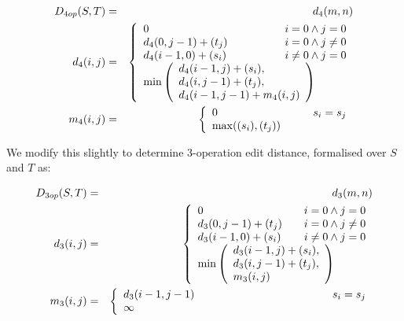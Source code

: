   \begin{eqnarray}
    D_{4op}(S,T) & = & d_4(m,n)\\
    d_4(i,j) & = & \left\{
      \begin{array}{l}
        0 \hfill\mathit{if}\; i=0\wedge j=0\\
        d_4(0,j-1) + \sweight(t_j) \hfill \mathit{if}\; i=0\wedge j\ne 0\\
        d_4(i-1,0) + \sweight(s_i) \hfill\mathit{if}\; i\ne0\wedge j=0\\
        \min\left(
          \begin{array}{l}
            d_4(i-1,j)+\sweight(s_i),\\
            d_4(i,j-1)+\sweight(t_j),\\
            d_4(i-1,j-1)+m_4(i,j)\\
          \end{array}
        \right)\hspace*{10mm}\hfill\mathit{otherwise}
      \end{array}
    \right.\\
    m_4(i,j) & = & \left\{
      \begin{array}{l}
        0 \hfill\mathit{if}\;s_i=s_j\\
        \max(\sweight(s_i),\sweight(t_j))\hspace*{21mm}\hfill\mathit{otherwise}
      \end{array}
    \right.
  \end{eqnarray}

We modify this slightly to determine 3-operation edit distance,
formalised over $S$ and $T$ as:

\begin{eqnarray}
  D_{3op}(S,T) & = & d_3(m,n)\\
  d_3(i,j) & = & \left\{
    \begin{array}{l}
      0 \hfill\mathit{if}\; i=0\wedge j=0\\
      d_3(0,j-1) + \sweight(t_j) \hfill \mathit{if}\; i=0\wedge j\ne 0\\
      d_3(i-1,0) + \sweight(s_i) \hfill\mathit{if}\; i\ne 0\wedge j=0\\
      \min\left(
        \begin{array}{l}
          d_3(i-1,j)+\sweight(s_i),\\
          d_3(i,j-1)+\sweight(t_j),\\
          m_3(i,j)\\
        \end{array}
      \right)\hspace*{10mm}\hfill\mathit{otherwise}
    \end{array}
  \right.\\
  m_3(i,j) & = & \left\{
    \begin{array}{l}
      d_3(i-1,j-1)\hspace*{43mm} \hfill\mathit{if}\;s_i=s_j\\
      \infty\hfill\mathit{otherwise}
    \end{array}
  \right.
\end{eqnarray}

